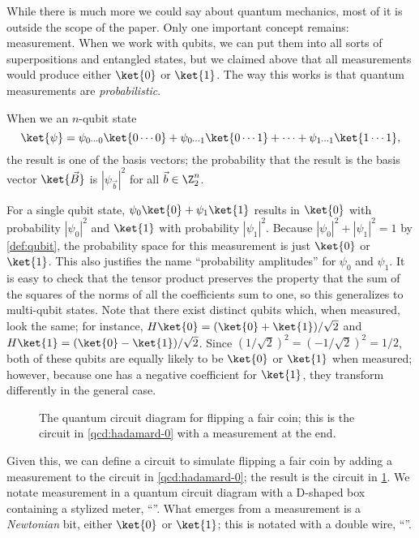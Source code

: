 While there is much more we could say about quantum mechanics, most of it is
outside the scope of the paper.  Only one important concept remains:
measurement.  When we work with qubits, we can put them into all sorts of
superpositions and entangled states, but we claimed above that all measurements
would produce either $\ket{0}$ or $\ket{1}$.  The way this works is that quantum
measurements are \emph{probabilistic}.

\begin{definition}[Measurement]\label{def:single-qubit-measurement}
  When we  an $n$-qubit state \[
    \ket{\psi} = \psi_{0\cdots0}\ket{0\cdots0}
               + \psi_{0\cdots1}\ket{0\cdots1}
               + \cdots
               + \psi_{1\cdots1}\ket{1\cdots1},
  \] the result is one of the basis vectors; the probability that the result is
  the basis vector $\ket{\vec{B}}$ is $|\psi_{\vec{b}}|^2$ for all $\vec{b} \in
  \Z_2^n$.
\end{definition}

For a single qubit state, $\psi_0\ket{0} + \psi_1\ket{1}$ results in $\ket{0}$
with probability $|\psi_0|^2$ and $\ket{1}$ with probability $|\psi_1|^2$. 
Because $|\psi_0|^2 + |\psi_1|^2 = 1$ by \cref{def:qubit}, the probability
space for this measurement is just $\ket{0}$ or $\ket{1}$.
This also justifies the name
``probability amplitudes'' for $\psi_0$ and $\psi_1$.  It is easy to check that
the tensor product preserves the property that the sum of the squares of the
norms of all the coefficients sum to one, so this generalizes to multi-qubit
states.  Note that there exist distinct qubits which, when measured, look the
same; for instance, $H\ket{0} = (\ket{0} + \ket{1})/\sqrt{2}$ and $H\ket{1} =
(\ket{0} - \ket{1})/\sqrt{2}$.  Since $(1/\sqrt{2})^2 = (-1/\sqrt{2})^2 = 1/2$,
both of these qubits are equally likely to be $\ket{0}$ or $\ket{1}$ when
measured; however, because one has a negative coefficient for $\ket{1}$, they
transform differently in the general case.

\begin{figure}
  \centerline{}
  \caption{The quantum circuit diagram for flipping a fair coin; this is the
    circuit in \cref{qcd:hadamard-0} with a measurement at the end.}
  \label{qcd:fair-coin}
\end{figure}

Given this, we can define a circuit to simulate flipping a fair coin by adding a
measurement to the circuit in \cref{qcd:hadamard-0}; the result is the circuit
in \cref{qcd:fair-coin}.  We notate measurement in a quantum circuit diagram
with a \textsf{D}-shaped box containing a stylized meter, ``\metersym''.  What
emerges from a measurement is a \emph{Newtonian} bit, either $\ket{0}$ or
$\ket{1}$; this is notated with a double wire,
``\QcircuitDemo{&\cw}''.

